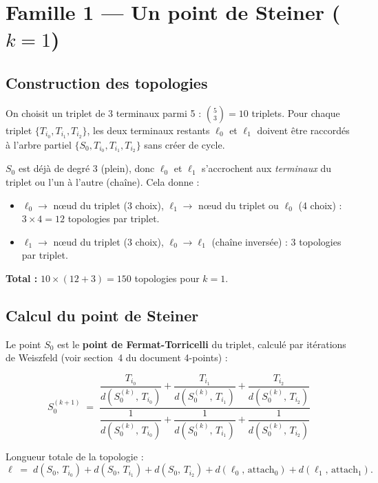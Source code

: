 \documentclass[12pt, a4paper]{article}
\newcommand{\dist}[2]{d\!\left(#1,\,#2\right)}
\begin{document}
\section{Famille 1 — Un point de Steiner ($k = 1$)}

\subsection{Construction des topologies}

On choisit un triplet de 3 terminaux parmi 5 : $\binom{5}{3} = 10$ triplets.
Pour chaque triplet $\{T_{i_0}, T_{i_1}, T_{i_2}\}$, les deux terminaux restants
$\ell_0$ et $\ell_1$ doivent être raccordés à l'arbre partiel
$\{S_0, T_{i_0}, T_{i_1}, T_{i_2}\}$ sans créer de cycle.

\medskip

$S_0$ est déjà de degré 3 (plein), donc $\ell_0$ et $\ell_1$ s'accrochent aux
\emph{terminaux} du triplet ou l'un à l'autre (chaîne). Cela donne :

\begin{itemize}
    \item $\ell_0 \to$ nœud du triplet (3 choix), $\ell_1 \to$ nœud du triplet ou $\ell_0$ (4 choix) : $3 \times 4 = 12$ topologies par triplet.
    \item $\ell_1 \to$ nœud du triplet (3 choix), $\ell_0 \to \ell_1$ (chaîne inversée) : 3 topologies par triplet.
\end{itemize}

\textbf{Total :} $10 \times (12 + 3) = 150$ topologies pour $k = 1$.

\subsection{Calcul du point de Steiner}

Le point $S_0$ est le \textbf{point de Fermat-Torricelli} du triplet, calculé par
itérations de Weiszfeld (voir section~4 du document 4-points) :

\[
    S_0^{(k+1)} \;=\;
    \frac{\dfrac{T_{i_0}}{\dist{S_0^{(k)}}{T_{i_0}}}
        + \dfrac{T_{i_1}}{\dist{S_0^{(k)}}{T_{i_1}}}
        + \dfrac{T_{i_2}}{\dist{S_0^{(k)}}{T_{i_2}}}}
         {\dfrac{1}{\dist{S_0^{(k)}}{T_{i_0}}}
        + \dfrac{1}{\dist{S_0^{(k)}}{T_{i_1}}}
        + \dfrac{1}{\dist{S_0^{(k)}}{T_{i_2}}}}
\]

Longueur totale de la topologie :
\[
    \ell \;=\;
    \dist{S_0}{T_{i_0}} + \dist{S_0}{T_{i_1}} + \dist{S_0}{T_{i_2}}
    + \dist{\ell_0}{\text{attach}_0} + \dist{\ell_1}{\text{attach}_1}.
\]
\end{document}
